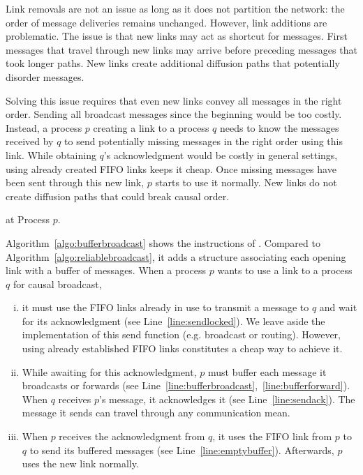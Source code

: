 Link removals are not an issue as long as it does not partition the network: the
order of message deliveries remains unchanged. However, link additions are
problematic.  The issue is that new links may act as shortcut for
messages. First messages that travel through new links may arrive before
preceding messages that took longer paths. New links create additional diffusion
paths that potentially disorder messages. 

Solving this issue requires that even new links convey all messages in the right
order. Sending all broadcast messages since the beginning would be too
costly. Instead, a process $p$ creating a link to a process $q$ needs to know
the messages received by $q$ to send potentially missing messages in the right
order using this link. While obtaining $q$'s acknowledgment would be costly in
general settings, using already created FIFO links keeps it cheap. Once missing
messages have been sent through this new link, $p$ starts to use it
normally. New links do not create diffusion paths that could break causal order.


\begin{algorithm}[h]
  
  \caption{\label{algo:bufferbroadcast}\CBROADCAST at Process $p$.}
\end{algorithm}

Algorithm~\ref{algo:bufferbroadcast} shows the instructions of \CBROADCAST. 
Compared to Algorithm~\ref{algo:reliablebroadcast}, it adds a structure
associating each opening link with a buffer of messages.  When a process $p$
wants to use a link to a process $q$ for causal broadcast,
\begin{enumerate}[(i)]
\item it must use the FIFO links already in use to transmit a message to $q$
  and wait for its acknowledgment (see Line~\ref{line:sendlocked}). We leave
  aside the implementation of this send function (e.g. broadcast or
  routing). However, using already established FIFO links constitutes a cheap
  way to achieve it.
\item While awaiting for this acknowledgment, $p$ must buffer each message it
  broadcasts or forwards (see
  Line~\ref{line:bufferbroadcast},~\ref{line:bufferforward}). When $q$ receives
  $p$'s message, it acknowledges it (see Line~\ref{line:sendack}). The message
  it sends can travel through any communication mean.
\item When $p$ receives the acknowledgment from $q$, it uses the FIFO link
  from $p$ to $q$ to send its buffered messages (see
  Line~\ref{line:emptybuffer}). Afterwards, $p$ uses the new link normally.
\end{enumerate}

